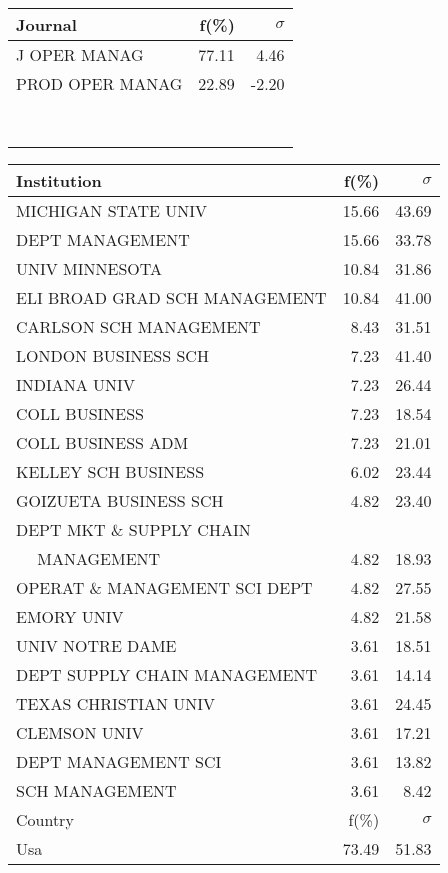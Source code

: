 \documentclass[a4paper,11pt]{report}
\begin{document}
\begin{landscape}
\begin{table}[!ht]
{\begin{tabular}{|l r r|}
\hline
\hline
Journal & f(\%) & $\sigma$\\
\hline
J OPER MANAG & 77.11 & 4.46\\
PROD OPER MANAG & 22.89 & -2.20\\
 &  & \\
 &  & \\
 &  & \\
 &  & \\
 &  & \\
 &  & \\
 &  & \\
 &  & \\
\hline
\end{tabular}
}
{\scriptsize\begin{tabular}{|l r r|}
\hline
Institution & f(\%) & $\sigma$\\
\hline
MICHIGAN STATE UNIV & 15.66 & 43.69\\
DEPT MANAGEMENT & 15.66 & 33.78\\
UNIV MINNESOTA & 10.84 & 31.86\\
ELI BROAD GRAD SCH MANAGEMENT & 10.84 & 41.00\\
CARLSON SCH MANAGEMENT & 8.43 & 31.51\\
LONDON BUSINESS SCH & 7.23 & 41.40\\
INDIANA UNIV & 7.23 & 26.44\\
COLL BUSINESS & 7.23 & 18.54\\
COLL BUSINESS ADM & 7.23 & 21.01\\
KELLEY SCH BUSINESS & 6.02 & 23.44\\
GOIZUETA BUSINESS SCH & 4.82 & 23.40\\
DEPT MKT \& SUPPLY CHAIN &  & \\
$\quad$ MANAGEMENT & 4.82 & 18.93\\
OPERAT \& MANAGEMENT SCI DEPT & 4.82 & 27.55\\
EMORY UNIV & 4.82 & 21.58\\
UNIV NOTRE DAME & 3.61 & 18.51\\
DEPT SUPPLY CHAIN MANAGEMENT & 3.61 & 14.14\\
TEXAS CHRISTIAN UNIV & 3.61 & 24.45\\
CLEMSON UNIV & 3.61 & 17.21\\
DEPT MANAGEMENT SCI & 3.61 & 13.82\\
SCH MANAGEMENT & 3.61 & 8.42\\
\hline
\hline
Country & f(\%) & $\sigma$\\
\hline
Usa & 73.49 & 51.83\\

\end{tabular}}
\end{table}
\end{landscape}
\end{document}
